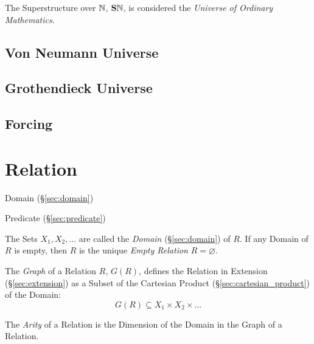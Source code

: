 The Superstructure over $\mathbb{N}$, $\mathbf{S}\mathbb{N}$, is
considered the \emph{Universe of Ordinary Mathematics}.



\subsection{Von Neumann Universe}\label{sec:vonneumann_universe}

\subsection{Grothendieck Universe}\label{sec:grothendieck_universe}


\subsection{Forcing}\label{sec:forcing}



\section{Relation}\label{sec:set_relation}

Domain (\S\ref{sec:domain})

Predicate (\S\ref{sec:predicate})

The Sets $X_1, X_2, \ldots$ are called the \emph{Domain}
(\S\ref{sec:domain}) of $R$. If any Domain of $R$ is empty, then $R$
is the unique \emph{Empty Relation} $R = \varnothing$.

The \emph{Graph} of a Relation $R$, $G(R)$, defines the Relation in
Extension (\S\ref{sec:extension}) as a Subset of the Cartesian Product
(\S\ref{sec:cartesian_product}) of the Domain:
\[
  G(R) \subseteq X_1 \times X_2 \times \ldots
\]

The \emph{Arity} of a Relation is the Dimension of the Domain in the
Graph of a Relation. %

